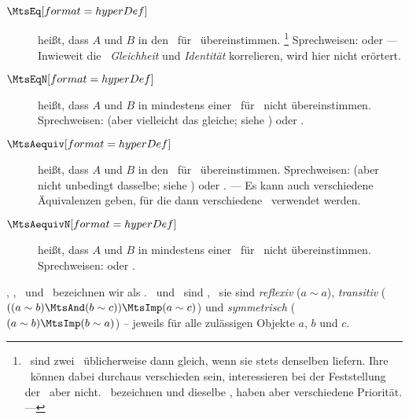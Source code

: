 \begin{description}
	\item[$\defSym{\MtsEq}$]  \label{def:Gleichheit}
	 heißt, dass $A$ und $B$ in den \interessierendenEigenschaften\ für \MtsEq\ übereinstimmen.%
	\footnote{%
		\textZB\ sind zwei \Junktoren\ üblicherweise dann gleich, wenn sie stets denselben \emph{\Wahrheitswert} liefern.
		Ihre \Bezeichnungen\ können dabei durchaus verschieden sein, interessieren bei der Feststellung der \Gleichheit\ aber nicht.
		\textZB\ bezeichnen \chrqt{\MtsAnd} und \chrqt{\MtsUnd} dieselbe \Operation, haben aber verschiedene Priorität. --- 
	}
	Sprechweisen:  oder 
	--- Inwieweit die \Begriffe\ \emph{Gleichheit} und \emph{Identität} korrelieren, wird hier nicht erörtert.
	\item[$\defSym{\MtsEqN}$]  \label{def:Ungleichheit}
	 heißt, dass $A$ und $B$ in mindestens einer \interessierendenEigenschaft\ für \MtsEq\ nicht übereinstimmen.
	Sprechweisen:  (aber vielleicht das gleiche; siehe \MtsEquiv) oder .
	\item[$\defSym{\MtsAequiv}$]  \label{def:Aequivalenz}
	 heißt, dass $A$ und $B$ in den \interessierendenEigenschaften\ für \MtsAequiv\ übereinstimmen.
	Sprechweisen:  (aber nicht unbedingt dasselbe; siehe \MtsEq) oder .
	--- Es kann auch verschiedene Äquivalenzen geben, für die dann verschiedene \Bezeichnungen\ verwendet werden.
	\item[$\defSym{\MtsAequivN}$]  \label{def:Kontravalenz}
	 heißt, dass $A$ und $B$ in mindestens einer \interessierendenEigenschaft\ für \MtsAequivN\ nicht übereinstimmen.
	Sprechweisen:  oder .
\end{description}

\MtsEq, \MtsEqN, \MtsAequiv\ und \MtsAequivN\ bezeichnen wir als  .
\Gleichheit\ und \Aequivalenz\ sind , \textdh\ sie sind \emph{reflexiv} ($a \sim a$), \emph{transitiv} ($((a \sim b) \MtsAnd (b \sim c)) \MtsImp (a \sim c)$) und \emph{symmetrisch} ($(a \sim b) \MtsImp (b \sim a)$)
-- jeweils für alle zulässigen Objekte $a$, $b$ und $c$.

